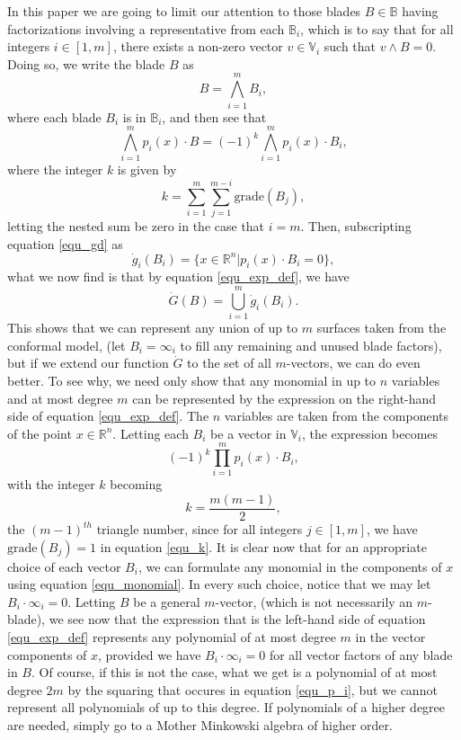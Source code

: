 \documentclass{birkjour}
\theoremstyle{definition}
\theoremstyle{remark}
\numberwithin{equation}{section}
\newcommand{\R}{\mathbb{R}}
\newcommand{\B}{\mathbb{B}}
\newcommand{\V}{\mathbb{V}}
\newcommand{\gd}{\dot{g}}
\newcommand{\Gd}{\dot{G}}
\newcommand{\nvai}{\infty}
\newcommand{\grade}{\mbox{grade}}
\begin{document}
In this paper we are going to limit our attention
to those blades $B\in\B$ having factorizations involving a representative from each $\B_i$,
which is to say that for all integers $i\in[1,m]$, there exists a non-zero vector $v\in\V_i$ such that $v\wedge B=0$.
Doing so, we write the blade $B$ as
\begin{equation}\label{equ_B_factored}
B = \bigwedge_{i=1}^m B_i,
\end{equation}
where each blade $B_i$ is in $\B_i$, and then see that
\begin{equation}\label{equ_exp_def}
\bigwedge_{i=1}^m p_i(x)\cdot B = (-1)^k\bigwedge_{i=1}^m p_i(x)\cdot B_i,
\end{equation}
where the integer $k$ is given by
\begin{equation}\label{equ_k}
k=\sum_{i=1}^m\sum_{j=1}^{m-i}\grade(B_j),
\end{equation}
letting the nested sum be zero in the case that $i=m$.
Then, subscripting equation \eqref{equ_gd} as
\begin{equation*}
\gd_i(B_i) = \{x\in\R^n|p_i(x)\cdot B_i=0\},
\end{equation*}
what we now find is that by equation \eqref{equ_exp_def}, we have
\begin{equation*}
\Gd(B) = \bigcup_{i=1}^m\gd_i(B_i).
\end{equation*}
This shows that we can represent any union of up to $m$ surfaces taken from the conformal model,
(let $B_i=\nvai_i$ to fill any remaining and unused blade factors),
but if we extend our function $\Gd$ to the set of all $m$-vectors, we can do even better.
To see why, we need only show that any monomial in up to $n$ variables and at most
degree $m$ can be represented by the expression on the right-hand side of equation \eqref{equ_exp_def}.
The $n$ variables are taken from the components of the point $x\in\R^n$.
Letting each $B_i$ be a vector in $\V_i$, the expression becomes
\begin{equation}\label{equ_monomial}
(-1)^k\prod_{i=1}^m p_i(x)\cdot B_i,
\end{equation}
with the integer $k$ becoming
\begin{equation}\label{equ_tri_numb}
k = \frac{m(m-1)}{2},
\end{equation}
the $(m-1)^{th}$ triangle number, since for all integers $j\in[1,m]$, we have $\grade(B_j)=1$ in
equation \eqref{equ_k}.
It is clear now that for an appropriate choice of each vector $B_i$, we can formulate any
monomial in the components of $x$ using equation \eqref{equ_monomial}.  In
every such choice, notice that we may let $B_i\cdot\nvai_i=0$.
Letting $B$ be a general $m$-vector, (which is not necessarily an $m$-blade),
we see now that the expression
that is the left-hand side of equation \eqref{equ_exp_def} represents
any polynomial of at most degree $m$
in the vector components of $x$, provided we have $B_i\cdot\nvai_i=0$
for all vector factors of any blade in $B$.
Of course, if this is not the case, what
we get is a polynomial of at most degree $2m$ by the squaring that
occures in equation \eqref{equ_p_i}, but we cannot represent all polynomials
of up to this degree.  If polynomials of a higher degree are needed, simply go to a
Mother Minkowski algebra of higher order.
\end{document}
